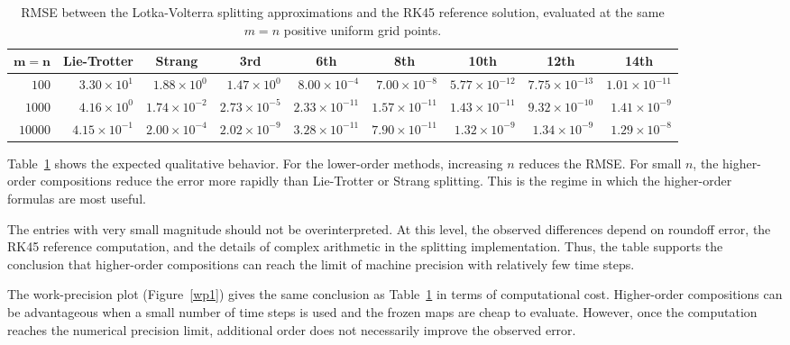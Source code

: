 \documentclass[preprint,1p,times,nopreprintline]{elsarticle}
\begin{document}
\begin{table}[t!]
\centering
\caption{RMSE between the Lotka-Volterra splitting approximations and the RK45 reference solution, evaluated at the same $m=n$ positive uniform grid points.}
\label{lokRmse}
\setlength{\tabcolsep}{4pt}
\fontsize{7}{8}\selectfont
\begin{tabular}{rrrrrrrrr}
\toprule
\multicolumn{1}{c}{$\mathbf{m=n}$} &
\multicolumn{1}{c}{\textbf{Lie-Trotter}} &
\multicolumn{1}{c}{\textbf{Strang}} &
\multicolumn{1}{c}{\textbf{3rd}} &
\multicolumn{1}{c}{\textbf{6th}} &
\multicolumn{1}{c}{\textbf{8th}} &
\multicolumn{1}{c}{\textbf{10th}} &
\multicolumn{1}{c}{\textbf{12th}} &
\multicolumn{1}{c}{\textbf{14th}}\\
\midrule
\rowcolor{gray!10}
$100$
& $3.30\times 10^{1}$
& $1.88\times 10^{0}$
& $1.47\times 10^{0}$
& $8.00\times 10^{-4}$
& $7.00\times 10^{-8}$
& $5.77\times 10^{-12}$
& $7.75\times 10^{-13}$
& $1.01\times 10^{-11}$ \\
\rowcolor{white}
$1000$
& $4.16\times 10^{0}$
& $1.74\times 10^{-2}$
& $2.73\times 10^{-5}$
& $2.33\times 10^{-11}$
& $1.57\times 10^{-11}$
& $1.43\times 10^{-11}$
& $9.32\times 10^{-10}$
& $1.41\times 10^{-9}$ \\
\rowcolor{gray!10}
$10000$
& $4.15\times 10^{-1}$
& $2.00\times 10^{-4}$
& $2.02\times 10^{-9}$
& $3.28\times 10^{-11}$
& $7.90\times 10^{-11}$
& $1.32\times 10^{-9}$
& $1.34\times 10^{-9}$
& $1.29\times 10^{-8}$ \\
\bottomrule
\end{tabular}
\end{table}

Table~\ref{lokRmse} shows the expected qualitative behavior. For the lower-order methods, increasing $n$ reduces the RMSE. For small $n$, the higher-order compositions reduce the error more rapidly than Lie-Trotter or Strang splitting. This is the regime in which the higher-order formulas are most useful.

The entries with very small magnitude should not be overinterpreted. At this level, the observed differences depend on roundoff error, the RK45 reference computation, and the details of complex arithmetic in the splitting implementation. Thus, the table supports the conclusion that higher-order compositions can reach the limit of machine precision with relatively few time steps.

The work-precision plot (Figure~\ref{wp1}) gives the same conclusion as Table~\ref{lokRmse} in terms of computational cost. Higher-order compositions can be advantageous when a small number of time steps is used and the frozen maps are cheap to evaluate. However, once the computation reaches the numerical precision limit, additional order does not necessarily improve the observed error.
\end{document}
